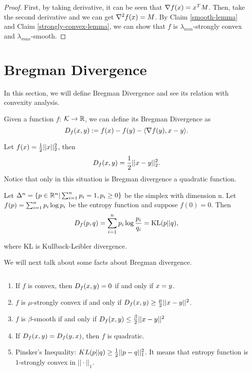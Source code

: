\documentclass[../main.tex]{subfiles}
\begin{document}
\begin{proof}
	
	First, by taking derivative, it can be seen that $\nabla f(x) = x^T M$. Then, take the second derivative and we can get $\nabla^2 f(x) = M$. By Claim \ref{smooth-lemma} and Claim \ref{strongly-convex-lemma}, we can show that $f$ is $\lambda_{min}$-strongly convex and $\lambda_{max}$-smooth.
\end{proof}

\section{Bregman Divergence}
In this section, we will define Bregman Divergence and see its relation with convexity analysis.

\begin{definition}
	Given a function $f$: $\mathcal{K} \to \mathbb{R}$, we can define its Bregman Divergence as
	\begin{equation}
		D_f(x, y) := f(x) - f(y) - \langle \nabla f(y), x - y \rangle.
	\end{equation}
\end{definition}

\begin{example}
		Let $f(x) = \frac{1}{2} ||x||_2^2$, then
		\begin{equation*}
		D_f(x, y) = \frac{1}{2} ||x - y||_2^2.
		\end{equation*}
		Notice that only in this situation is Bregman divergence a quadratic function.
\end{example}

\begin{example}
	Let $\Delta^n = \{p \in \mathbb{R}^n| \sum_{i=1}^n p_i = 1, p_i \geq 0\}$ be the simplex with dimension n. Let $f(p) = \sum_{i=1}^n p_i\log p_i$ be the entropy function and suppose $f(0) = 0$. Then
	\begin{equation*}
	D_f(p,q) = \sum\limits_{i=1}^n p_i\log \frac{p_i}{q_i} = \textmd{KL}(p || q),
	\end{equation*}
	
	where KL is Kullback-Leibler divergence.
\end{example}

We will next talk about some facts about Bregman divergence.

\begin{fact} $ $
	\begin{enumerate}
		\item If $f$ is convex, then $D_f (x, y) = 0$ if and only if $x=y$.
		\item $f$ is $\mu$-strongly convex if and only if $D_f(x, y) \geq \frac{\mu}{2} ||x-y||^2$.
		\item $f$ is $\beta$-smooth if and only if $D_f(x, y) \leq \frac{\beta}{2} ||x - y||^2$
		\item If $D_f(x, y) = D_f(y, x)$, then $f$ is quadratic.
		\item Pinsker's Inequality: $KL(p|| q) \geq \frac{1}{2} ||p - q||_1^2$. It means that entropy function is $1$-strongly convex in $||\cdot||_1$.
	\end{enumerate}
\end{fact}
\end{document}
